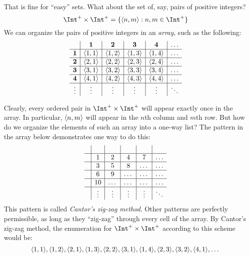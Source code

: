 \documentclass[../../../include/open-logic-section]{subfiles}
\begin{document}
\begin{explain}
That is fine for ``easy'' sets. What about the set of, say, pairs of
positive integers?{}
\[
\Int^+ \times \Int^+ = \Setabs{\tuple{n,m}}{n,m \in \Int^+}
\]
We can organize the pairs of positive integers 
in an \emph{array}, such as the following:
\[
\begin{array}{ c | c | c | c | c | c}
& \textbf 1 & \textbf 2 & \textbf 3 & \textbf 4 & \dots \\
\hline
\textbf 1 & \tuple{1,1} & \tuple{1,2} & \tuple{1,3} & \tuple{1,4} & \dots \\
\hline
\textbf 2 & \tuple{2,1} & \tuple{2,2} & \tuple{2,3} & \tuple{2,4} & \dots \\
\hline
\textbf 3 & \tuple{3,1} & \tuple{3,2} & \tuple{3,3} & \tuple{3,4} & \dots \\
\hline
\textbf 4 & \tuple{4,1} & \tuple{4,2} & \tuple{4,3} & \tuple{4,4} & \dots \\
\hline
\vdots & \vdots & \vdots & \vdots & \vdots & \ddots\\
\end{array}
\]

Clearly, every ordered pair in $\Int^+ \times \Int^+$ will appear
exactly once in the array. In particular, $\langle n,m \rangle$ will appear in
the $n$th column and $m$th row. But how do we organize the elements of
such an array into a one-way list? The pattern in the array below
demonstrates one way to do this:
\[
\begin{array}{ c | c | c | c | c | c }
& & & & & \\
\hline
& 1 & 2 & 4 & 7 & \dots \\
\hline
& 3 & 5 & 8 & \dots & \dots \\
\hline
& 6 & 9 & \dots & \dots & \dots \\
\hline
& 10 & \dots & \dots & \dots & \dots \\
\hline
& \vdots & \vdots & \vdots & \vdots & \ddots\\
\end{array}
\]
This pattern is called \emph{Cantor's zig-zag method}. Other patterns
are perfectly permissible, as long as they ``zig-zag'' through every
cell of the array. By Cantor's zig-zag method, the enumeration for
$\Int^+ \times \Int^+$ according to this scheme would be:
\[
\langle 1,1 \rangle, \langle 1,2 \rangle, \langle 2,1 \rangle, \langle 1,3 \rangle, \langle 2,2 \rangle,
\langle 3,1 \rangle, \langle 1,4 \rangle, \langle 2,3 \rangle, \langle 3,2 \rangle, \langle 4,1 \rangle, \dots
\]


\end{explain}
\end{document}
